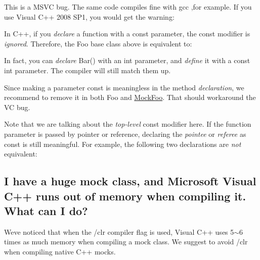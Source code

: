 This is a M\+S\+VC bug. The same code compiles fine with gcc ,for example. If you use Visual C++ 2008 S\+P1, you would get the warning\+: 
\begin{DoxyCode}{0}
\end{DoxyCode}


In C++, if you {\itshape declare} a function with a {\ttfamily const} parameter, the {\ttfamily const} modifier is {\itshape ignored}. Therefore, the {\ttfamily Foo} base class above is equivalent to\+: 
\begin{DoxyCode}{0}
\DoxyCodeLine{\};}
\end{DoxyCode}


In fact, you can {\itshape declare} Bar() with an {\ttfamily int} parameter, and {\itshape define} it with a {\ttfamily const int} parameter. The compiler will still match them up.

Since making a parameter {\ttfamily const} is meaningless in the method {\itshape declaration}, we recommend to remove it in both {\ttfamily Foo} and {\ttfamily \mbox{\hyperlink{classMockFoo}{Mock\+Foo}}}. That should workaround the VC bug.

Note that we are talking about the {\itshape top-\/level} {\ttfamily const} modifier here. If the function parameter is passed by pointer or reference, declaring the {\itshape pointee} or {\itshape referee} as {\ttfamily const} is still meaningful. For example, the following two declarations are {\itshape not} equivalent\+: 
\begin{DoxyCode}{0}
\end{DoxyCode}


\subsection*{I have a huge mock class, and Microsoft Visual C++ runs out of memory when compiling it. What can I do?}

We\textquotesingle{}ve noticed that when the {\ttfamily /clr} compiler flag is used, Visual C++ uses 5$\sim$6 times as much memory when compiling a mock class. We suggest to avoid {\ttfamily /clr} when compiling native C++ mocks.

